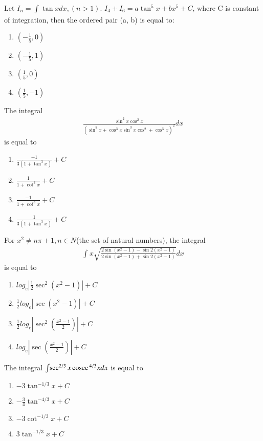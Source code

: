 \item Let $I_n = \int_{}\tan xdx,(n > 1)$. $I_4 + I_6 = a\tan^{5}x + bx^5 + C$, where C is constant of integration, then the ordered pair (a, b) is equal to:
\begin{enumerate}
\item $(-\frac{1}{5}, 0)$
\item $(-\frac{1}{5}, 1)$
\item $(\frac{1}{5}, 0)$
\item $(\frac{1}{5}, -1)$
\end{enumerate}

\item The integral
\begin{align*}
\frac{\sin^{2}x \cos^{2}x}{(\sin^{5}x + \cos^{3}x\sin^{3}x\cos^{2} + \cos^{5}x)^2}dx
\end{align*}
is equal to
\begin{enumerate}
\item $\frac{-1}{3(1 + \tan^{3}x)} + C$
\item $\frac{1}{1 + \cot^{3}x} + C$
\item $\frac{-1}{1 + \cot^{3}x} + C$
\item $\frac{1}{3(1 + \tan^{3}x)} + C$
\end{enumerate}

\item For $x^2 \neq n\pi + 1, n \in N$(the set of natural numbers), the integral
\begin{align*}
\int_{}x \sqrt{\frac{2\sin(x^2 - 1) - \sin 2(x^2 - 1)}{2\sin(x^2 - 1) + \sin 2(x^2 - 1)}}dx
\end{align*}
is equal to
\begin{enumerate}
\item $log_e|\frac{1}{2}\sec^{2}(x^2 - 1)| + C$
\item $\frac{1}{2}log_e|\sec(x^2 - 1)| + C$
\item $\frac{1}{2}log_e|\sec^{2}(\frac{x^2 - 1}{2})| + C$
\item $log_e|\sec(\frac{x^2 - 1}{2})| + C$
\end{enumerate}

\item The integral $\int_{}\sec^{2/3}x\,\text{cosec}\,^{4/3}xdx$ is equal to
\begin{enumerate}
\item $-3\tan^{-1/3}x + C$
\item $-\frac{3}{4}\tan^{-4/3}x + C$
\item $-3\cot^{-1/3}x + C$
\item $3\tan^{-1/3}x + C$
\end{enumerate}








